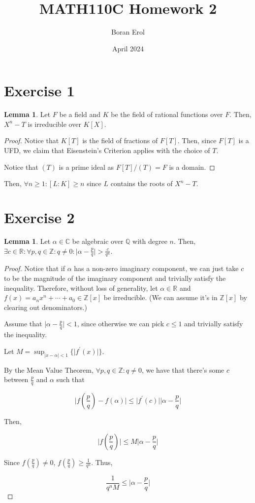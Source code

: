 \documentclass{article}
\title{MATH110C Homework 2}
\date{April 2024}
\author{Boran Erol}
\theoremstyle{definition}
\newtheorem{lemma}[theorem]{Lemma}
\newcommand{\Z}{\mathbb{Z}}
\newcommand{\R}{\mathbb{R}}
\newcommand{\Q}{\mathbb{Q}}
\newcommand{\C}{\mathbb{C}}
\begin{document}
\maketitle

\section{Exercise 1}

\begin{lemma}
    Let $F$ be a field and $K$ be the field of rational functions
    over $F$. Then, $X^{n} - T$ is irreducible over $K[X]$.
\end{lemma}
\begin{proof}
    Notice that $K[T]$ is the field of fractions of $F[T]$.
    Then, since $F[T]$ is a UFD, we claim that
    Eisenstein's Criterion
    applies with the choice of $T$.

    Notice that $(T)$ is a prime ideal as $F[T]/(T) = F$
    is a domain.
\end{proof}

Then, $\forall n \geq 1: [L : K] \geq n$ since $L$
contains the roots of $X^{n} - T$.

\newpage

\section{Exercise 2}

\begin{lemma}
    Let $\alpha \in \C$ be algebraic over $\Q$
    with degree $n$. Then, $\exists c \in \R: \forall p,q
    \in \Z: q \neq 0: \lvert \alpha - \frac{p}{q} \rvert > \frac{c}{q^{n}}$.
\end{lemma}
\begin{proof}
    Notice that if $\alpha$ has a non-zero imaginary component, we
    can just take $c$ to be the magnitude of the imaginary component
    and trivially satisfy the inequality. Therefore, without loss
    of generality, let $\alpha \in \R$ and $f(x) = a_{n}x^{n} + \cdots + a_{0} \in \Z[x]$ 
    be irreducible. (We can assume it's in $\Z[x]$ by clearing out denominators.)

    Assume that $\lvert \alpha - \frac{p}{q} \rvert < 1$, since otherwise
    we can pick $c \leq 1$ and trivially satisfy the inequality.

    Let $M = \sup_{\lvert x - \alpha \rvert < 1}\{ \lvert f^{\prime}(x) \rvert \}$.

    By the Mean Value Theorem, $\forall p,q
    \in \Z: q \neq 0$, we have that there's some $c$ between $\frac{p}{q}$ and $\alpha$
    such that 

    \[ \lvert f(\frac{p}{q}) - f(\alpha) \rvert \leq \lvert f^{\prime}(c) \rvert \lvert \alpha - \frac{p}{q} \rvert \]
    
    Then,

    \[ \lvert f(\frac{p}{q}) \rvert \leq M \lvert \alpha - \frac{p}{q} \rvert \]

    Since $f(\frac{p}{q}) \neq 0$, $f(\frac{p}{q}) \geq \frac{1}{q^{n}}$. Thus,

    \[ \frac{1}{q^{n}M} \leq \lvert \alpha - \frac{p}{q} \rvert \] 
\end{proof}
\end{document}

